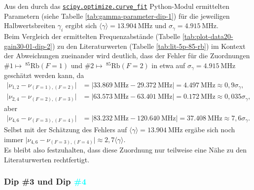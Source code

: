 \noindent Aus den durch das \href{https://docs.scipy.org/doc/scipy/reference/generated/scipy.optimize.curve_fit.html}{\texttt{scipy.optimize.curve_fit}} Python-Modul ermittelten Parametern (siehe Tabelle \ref{tab:gamma-parameter-dip-1}) für die jeweiligen Halbwertsbreiten $\gamma_{i}$ ergibt sich $\langle \gamma \rangle = \SI{13,904}{\mega \hertz}$ und $\sigma_{\gamma} = \SI{4,915}{\mega \hertz}$. \\
Beim Vergleich der ermittelten Frequenzabstände (Tabelle \ref{tab:plot-data20-gain30-01-dip-2}) zu den Literaturwerten (Tabelle \ref{tab:lit-5p-85-rb}) im Kontext der Abweichungen zueinander wird deutlich, dass der Fehler für die Zuordnungen $\#1 \mapsto \ ^{85}\text{Rb}(F = 1)$ und $\#2 \mapsto \ ^{85}\text{Rb}(F = 2)$ in etwa auf $\sigma_{\gamma} = \SI{4,915}{\mega \hertz}$ geschätzt werden kann, da 
\begin{align*}
    \big \vert \nu_{1,2} - \nu_{(F = 1), (F = 2)} \big \vert &= \big \vert \SI{33,869}{\mega \hertz} - \SI{29,372}{\mega \hertz} \big \vert = \SI{4,497}{\mega \hertz} \approx 0,9 \sigma_{\gamma}, \\
    \big \vert \nu_{2,4} - \nu_{(F = 2), (F = 3)} \big \vert &= \big \vert \SI{63,573}{\mega \hertz} - \SI{63,401}{\mega \hertz} \big \vert = \SI{0,172}{\mega \hertz} \approx 0,035 \sigma_{\gamma},
\end{align*}
aber 
\begin{align*}
    \big \vert \nu_{4,6} - \nu_{(F = 3), (F = 4)} \big \vert &= \big \vert \SI{83,232}{\mega \hertz} - \SI{120,640}{\mega \hertz} \big \vert = \SI{37,408}{\mega \hertz} \approx 7,6 \sigma_{\gamma}.
\end{align*}
Selbst mit der Schätzung des Fehlers auf $\langle \gamma \rangle = \SI{13,904}{\mega \hertz}$ ergäbe sich noch immer $\big \vert \nu_{4,6} - \nu_{(F = 3), (F = 4)} \big \vert \approx 2,7 \langle \gamma \rangle$. \\

\noindent Es bleibt also festzuhalten, dass diese Zuordnung nur teilweise eine Nähe zu den Literaturwerten rechtfertigt.

\subsubsection{Dip \textcolor{pink!50!purple}{\#3} und Dip \textcolor{cyan}{\#4}}

